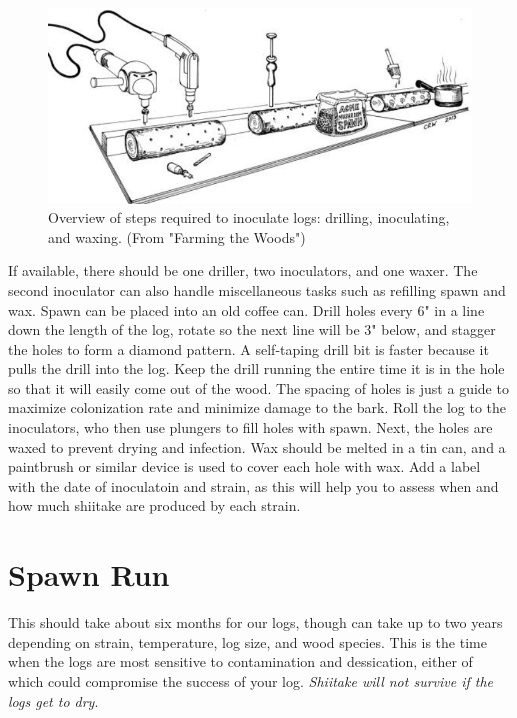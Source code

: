 \documentclass{tufte-handout}
\begin{document}
\begin{figure}
\includegraphics{innoculation-workflow}
\caption{Overview of steps required to inoculate logs: drilling, inoculating, and waxing. (From "Farming the Woods")}
\end{figure}

If available, there should be one driller, two inoculators, and one waxer.
The second inoculator can also handle miscellaneous tasks such as refilling spawn and wax.
Spawn can be placed into an old coffee can. 
Drill holes every 6" in a line down the length of the log, rotate so the next line will be 3" below, and stagger the holes to form a diamond pattern. 
A self-taping drill bit is faster because it pulls the drill into the log.
Keep the drill running the entire time it is in the hole so that it will easily come out of the wood. 
The spacing of holes is just a guide to maximize colonization rate
and minimize damage to the bark. 
Roll the log to the inoculators, who then use plungers to fill holes with spawn.
Next, the holes are waxed to prevent
drying and infection. 
Wax should be melted in a tin can, and a paintbrush or similar device is used to cover each hole with wax.
Add a label with the date of inoculatoin and strain, as this will help you to assess
when and how much shiitake are produced
by each strain.

\section{Spawn Run}

 This should take about six months for our logs, though can take up to two years depending on strain, temperature, log size, and wood species.
This is the time when the logs are most sensitive to contamination and dessication, either of which could compromise the success of your log.
\emph{Shiitake will not survive if the logs get to dry}.
\end{document}
